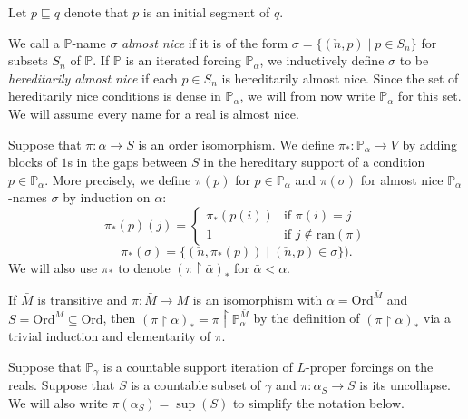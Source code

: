 \documentclass[a4paper, 11pt]{amsart}
\theoremstyle{remark}
\newcommand{\Ord}{\mathrm{Ord}}
\newcommand{\PP}{\mathbb{P}}
\newcommand{\ran}{\mathrm{ran}}
\begin{document}
Let $p\sqsubseteq q$ denote that $p$ is an initial segment of $q$. 






We call a $\PP$-name $\sigma$ \emph{almost nice} if it is of the form $\sigma=\{(\check{n},p)\mid p \in S_n\}$ for subsets $S_n$ of $\PP$. 
If $\PP$ is an iterated forcing $\PP_\alpha$, we inductively define $\sigma$ to be \emph{hereditarily almost nice} if each $p\in S_n$ is hereditarily almost nice. 
Since the set of hereditarily nice conditions is dense in $\PP_\alpha$, we will from now write $\PP_\alpha$ for this set. 
We will assume every name for a real is almost nice. 


Suppose that $\pi\colon \alpha\rightarrow S$ is an order isomorphism. 
We define $\pi_*\colon \PP_\alpha\rightarrow V$ by adding blocks of $1$s in the gaps between $S$ in the hereditary support of a condition $p\in\PP_\alpha$. 
More precisely, we define $\pi(p)$ for $p\in\PP_\alpha$ and $\pi(\sigma)$ for almost nice $\PP_\alpha$-names $\sigma$ by induction on $\alpha$: 
$$\pi_*(p)(j)=   \begin{cases} \pi_*(p(i)) &\mbox{if } \pi(i)=j \\ 
1 & \mbox{if } j\notin \ran(\pi) \end{cases}$$ 
$$\pi_*(\sigma)=\{(\check{n},\pi_*(p))\mid (\check{n},p)\in \sigma\}).$$ 
We will also use $\pi_*$ to denote $(\pi{\upharpoonright}\bar{\alpha})_*$ for $\bar{\alpha}<\alpha$. 

If $\bar{M}$ is transitive and $\pi\colon \bar{M}\rightarrow M$ is an isomorphism with $\alpha=\Ord^{\bar{M}}$ and $S=\Ord^M\subseteq \Ord$, then  $(\pi{\upharpoonright}\alpha)_*=\pi{\upharpoonright}\PP_\alpha^{\bar{M}}$ by the definition of $(\pi{\upharpoonright}\alpha)_*$ via a trivial induction and elementarity of $\pi$. 

Suppose that $\PP_\gamma$ is a countable support iteration of $L$-proper forcings on the reals. 
Suppose that $S$ is a countable subset of $\gamma$ and $\pi\colon \alpha_S\rightarrow S$ is its uncollapse. 
We will also write $\pi(\alpha_S)=\sup(S)$ to simplify the notation below. 
\end{document}
